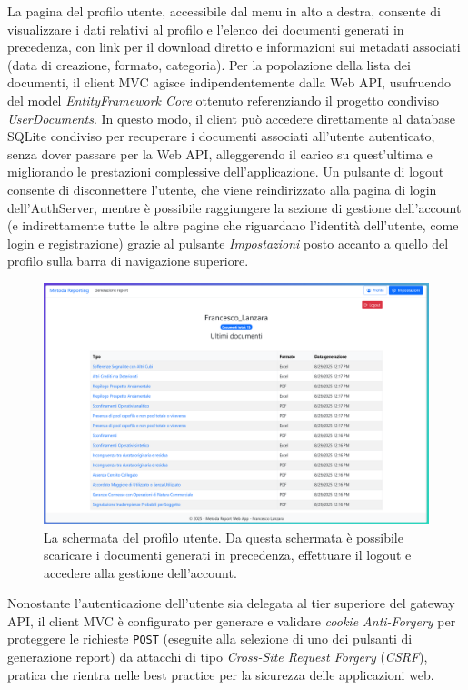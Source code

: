 La pagina del profilo utente, accessibile dal menu in alto a destra, consente di visualizzare i dati relativi al profilo e l'elenco dei documenti generati in precedenza, con link per il download diretto e informazioni sui metadati associati (data di creazione, formato, categoria). Per la popolazione della lista dei documenti, il client MVC agisce indipendentemente dalla Web API, usufruendo del model \emph{EntityFramework Core} ottenuto referenziando il progetto condiviso \emph{UserDocuments}. In questo modo, il client può accedere direttamente al database SQLite condiviso per recuperare i documenti associati all'utente autenticato, senza dover passare per la Web API, alleggerendo il carico su quest'ultima e migliorando le prestazioni complessive dell'applicazione.
Un pulsante di logout consente di disconnettere l'utente, che viene reindirizzato alla pagina di login dell'AuthServer, mentre è possibile raggiungere la sezione di gestione dell'account (e indirettamente tutte le altre pagine che riguardano l'identità dell'utente, come login e registrazione) grazie al pulsante \emph{Impostazioni} posto accanto a quello del profilo sulla barra di navigazione superiore.

\begin{figure}[H]
        \centering
        \includegraphics[width=15.5cm]{fig/screen_profile.png}
        \caption[Schermata profilo]{La schermata del profilo utente. Da questa schermata è possibile scaricare i documenti generati in precedenza, effettuare il logout e accedere alla gestione dell'account.}
\end{figure}

Nonostante l'autenticazione dell'utente sia delegata al tier superiore del gateway API, il client MVC è configurato per generare e validare \emph{cookie Anti-Forgery} per proteggere le richieste \texttt{POST} (eseguite alla selezione di uno dei pulsanti di generazione report) da attacchi di tipo \emph{Cross-Site Request Forgery} (\emph{CSRF}), pratica che rientra nelle best practice per la sicurezza delle applicazioni web.

